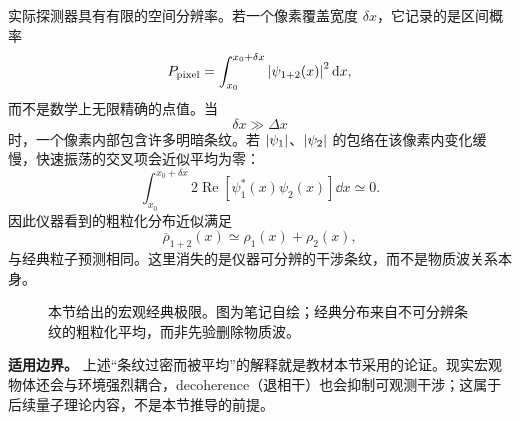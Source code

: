 实际探测器具有有限的空间分辨率。若一个像素覆盖宽度 $\delta x$，它记录的是区间概率
\begin{equation}
  P_{\mathrm{pixel}}
  =\int_{x_0}^{x_0+\delta x}
   \left|\psi_{1+2}(x)\right|^2\mathop{}\!\mathrm{d} x,
  \label{eq:QM-C03-S04-pixel-probability}
\end{equation}
而不是数学上无限精确的点值。当
\begin{equation}
  \delta x\gg\Delta x
  \label{eq:QM-C03-S04-unresolved-condition}
\end{equation}
时，一个像素内部包含许多明暗条纹。若 $\left|\psi_1\right|$、$\left|\psi_2\right|$ 的包络在该像素内变化缓慢，快速振荡的交叉项会近似平均为零：
\begin{equation}
  \int_{x_0}^{x_0+\delta x}
  2\operatorname{Re}\!\left[\psi_1^*(x)\psi_2(x)\right]\dd x
  \simeq0.
  \label{eq:QM-C03-S04-cross-term-average}
\end{equation}
因此仪器看到的粗粒化分布近似满足
\begin{equation}
  \boxed{
  \overline{\rho}_{1+2}(x)
  \simeq\rho_1(x)+\rho_2(x),}
  \label{eq:QM-C03-S04-classical-coarse-graining}
\end{equation}
与经典粒子预测相同。这里消失的是仪器可分辨的干涉条纹，而不是物质波关系本身。

\begin{figure}[htbp]
  \centering
  \caption{本节给出的宏观经典极限。图为笔记自绘；经典分布来自不可分辨条纹的粗粒化平均，而非先验删除物质波。}
  \label{fig:QM-C03-S04-macroscopic-limit}
\end{figure}

\textbf{适用边界。}
上述“条纹过密而被平均”的解释就是教材本节采用的论证。现实宏观物体还会与环境强烈耦合，decoherence（退相干）也会抑制可观测干涉；这属于后续量子理论内容，不是本节推导的前提。

